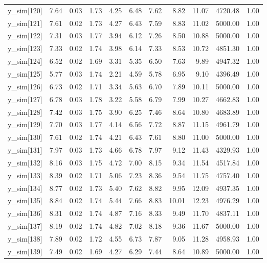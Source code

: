 \begin{table}[ht]
\begin{tabular}{rrrrrrrrrrr}
  y\_sim[120] & 7.64 & 0.03 & 1.73 & 4.25 & 6.48 & 7.62 & 8.82 & 11.07 & 4720.48 & 1.00 \\ 
  y\_sim[121] & 7.61 & 0.02 & 1.73 & 4.27 & 6.43 & 7.59 & 8.83 & 11.02 & 5000.00 & 1.00 \\ 
  y\_sim[122] & 7.31 & 0.03 & 1.77 & 3.94 & 6.12 & 7.26 & 8.50 & 10.88 & 5000.00 & 1.00 \\ 
  y\_sim[123] & 7.33 & 0.02 & 1.74 & 3.98 & 6.14 & 7.33 & 8.53 & 10.72 & 4851.30 & 1.00 \\ 
  y\_sim[124] & 6.52 & 0.02 & 1.69 & 3.31 & 5.35 & 6.50 & 7.63 & 9.89 & 4947.32 & 1.00 \\ 
  y\_sim[125] & 5.77 & 0.03 & 1.74 & 2.21 & 4.59 & 5.78 & 6.95 & 9.10 & 4396.49 & 1.00 \\ 
  y\_sim[126] & 6.73 & 0.02 & 1.71 & 3.34 & 5.63 & 6.70 & 7.89 & 10.11 & 5000.00 & 1.00 \\ 
  y\_sim[127] & 6.78 & 0.03 & 1.78 & 3.22 & 5.58 & 6.79 & 7.99 & 10.27 & 4662.83 & 1.00 \\ 
  y\_sim[128] & 7.42 & 0.03 & 1.75 & 3.90 & 6.25 & 7.46 & 8.64 & 10.80 & 4683.89 & 1.00 \\ 
  y\_sim[129] & 7.70 & 0.03 & 1.77 & 4.14 & 6.56 & 7.72 & 8.87 & 11.15 & 4961.79 & 1.00 \\ 
  y\_sim[130] & 7.61 & 0.02 & 1.74 & 4.21 & 6.43 & 7.61 & 8.80 & 11.00 & 5000.00 & 1.00 \\ 
  y\_sim[131] & 7.97 & 0.03 & 1.73 & 4.66 & 6.78 & 7.97 & 9.12 & 11.43 & 4329.93 & 1.00 \\ 
  y\_sim[132] & 8.16 & 0.03 & 1.75 & 4.72 & 7.00 & 8.15 & 9.34 & 11.54 & 4517.84 & 1.00 \\ 
  y\_sim[133] & 8.39 & 0.02 & 1.71 & 5.06 & 7.23 & 8.36 & 9.54 & 11.75 & 4757.40 & 1.00 \\ 
  y\_sim[134] & 8.77 & 0.02 & 1.73 & 5.40 & 7.62 & 8.82 & 9.95 & 12.09 & 4937.35 & 1.00 \\ 
  y\_sim[135] & 8.84 & 0.02 & 1.74 & 5.44 & 7.66 & 8.83 & 10.01 & 12.23 & 4976.29 & 1.00 \\ 
  y\_sim[136] & 8.31 & 0.02 & 1.74 & 4.87 & 7.16 & 8.33 & 9.49 & 11.70 & 4837.11 & 1.00 \\ 
  y\_sim[137] & 8.19 & 0.02 & 1.74 & 4.82 & 7.02 & 8.18 & 9.36 & 11.67 & 5000.00 & 1.00 \\ 
  y\_sim[138] & 7.89 & 0.02 & 1.72 & 4.55 & 6.73 & 7.87 & 9.05 & 11.28 & 4958.93 & 1.00 \\ 
  y\_sim[139] & 7.49 & 0.02 & 1.69 & 4.27 & 6.29 & 7.44 & 8.64 & 10.89 & 5000.00 & 1.00 \\ 

\end{tabular}
\end{table}
